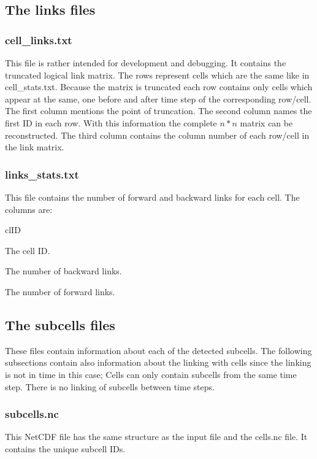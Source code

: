 \documentclass{scrartcl}
\begin{document}
\subsection{The links files}
\subsubsection{cell\_links.txt}
This file is rather intended for development and debugging. It contains the truncated logical link matrix. The rows represent cells which are the same like in cell\_stats.txt. Because the matrix is truncated each row contains only cells which appear at the same, one before and after time step of the corresponding row/cell. The first column mentions the point of truncation. The second column names the first ID in each row. With this information the complete $n*n$ matrix can be reconstructed. The third column contains the column number of each row/cell in the link matrix.

\subsubsection{links\_stats.txt}
This file contains the number of forward and backward links for each cell. The columns are:
\begin{labeling}{clID}
	\item[clID] The cell ID.
	\item[nbw] The number of backward links.
	\item[nfw] The number of forward links.

\end{labeling}

\subsection{The subcells files}
These files contain information about each of the detected subcells. The following subsections contain also information about the linking with cells since the linking is not in time in this case; Cells can only contain subcells from the same time step. There is no linking of subcells between time steps.

\subsubsection{subcells.nc}
This NetCDF file has the same structure as the input file and the cells.nc file. It contains the unique subcell IDs.
\end{document}
